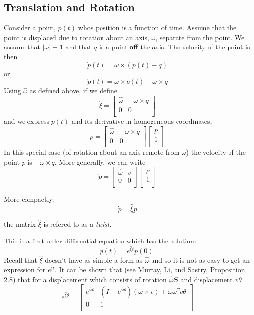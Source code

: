 \subsection{Translation and Rotation}
Consider a point, $p(t)$ whos position is a function of time.  Assume that the point is displaced due to
rotation about an axis, $\omega$, separate from the point.  We assume that $|\omega|=1$ and that $q$ is
a point {\bf off} the axis. The velocity of the point is then
\[
\dot{p}(t) = \omega \times (p(t) - q)
\]
or
\[
\dot{p}(t) = \omega \times p(t) - \omega \times q
\]
Using $\hat{\omega}$ as defined above, if we define
\[
\hat{\xi} = \left[
\begin{array}{cc}
\hat{\omega}   &       -\omega\times q \\
0       &       0       \\
\end{array}
\right]
\]
and we express $p(t)$ and its derivative in homogeneous coordinates,
\[
\dot{p} =  \left[
\begin{array}{cc}
\hat{\omega}   &       -\omega\times q \\
0       &       0       \\
\end{array}
\right]
\left[
\begin{array}{c}
p\\
1\\
\end{array}\right]
\]
In this special case (of rotation about an axis remote from $\omega$) the velocity
of the point $p$ is $-\omega\times q$.  More generally, we can write
\[
\dot{p} =  \left[
\begin{array}{cc}
\hat{\omega}   &       v \\
0       &       0       \\
\end{array}
\right]
\left[
\begin{array}{c}
p\\
1\\
\end{array}\right]
\]

More compactly:
\[
\dot{p} = \hat{\xi}p
\]

the matrix $\hat{\xi}$ is refered to as a {\it twist}.

This is a first order differential equation which has the solution:
\[
p(t) = e^{\hat{\xi}t}p(0).
\]
Recall that $\hat{\xi}$ doesn't have as simple a form as $\hat{\omega}$ and so it is
not as easy to get an expression for $e^{\hat{\xi}t}$.
It can be shown that (see Murray, Li, and Sastry, Proposition 2.8) that for a displacement which
consists of rotation $\hat{\omega}\Theta$ and displacement $v\theta$
\begin{equation}\label{matrixexp}
e^{\hat{\xi}\theta} =
\left[
  \begin{array}{cc}
  e^{\hat{\omega}\theta}   & (I-e^{\hat{\omega}\theta})(\omega\times v) + \omega\omega^Tv\theta          \\
  0                        &       1                               \\
  \end{array}
\right]
\end{equation}

